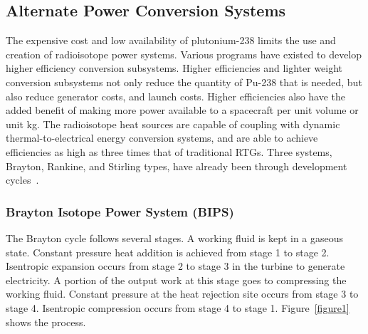 \documentclass{article}
\begin{document}
\subsection{Alternate Power Conversion Systems}

The expensive cost and low availability of plutonium-238 limits the use and creation of radioisotope power systems. Various programs have existed to develop higher efficiency conversion subsystems. Higher efficiencies and lighter weight conversion subsystems not only reduce the quantity of Pu-238 that is needed, but also reduce generator costs, and launch costs. Higher efficiencies also have the added benefit of making more power available to a spacecraft per unit volume or unit kg. The radioisotope heat sources are capable of coupling with dynamic thermal-to-electrical energy conversion systems, and are able to achieve efficiencies as high as three times that of traditional RTGs. Three systems, Brayton, Rankine, and Stirling types, have already been through development cycles~\cite{mason2007historical}.

\subsubsection{Brayton Isotope Power System (BIPS)}

The Brayton cycle follows several stages. A working fluid is kept in a gaseous state. Constant pressure heat addition is achieved from stage 1 to stage 2. Isentropic expansion occurs from stage 2 to stage 3 in the turbine to generate electricity. A portion of the output work at this stage goes to compressing the working fluid. Constant pressure at the heat rejection site occurs from stage 3 to stage 4. Isentropic compression occurs from stage 4 to stage 1. Figure~\ref{figure1} shows the process.
\end{document}
